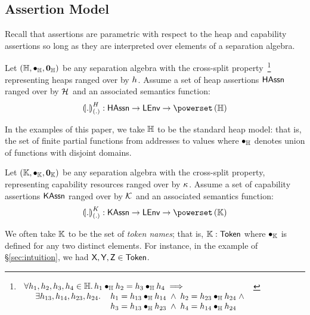 \subsection{Assertion Model}
Recall that \colosl assertions are parametric with respect to the heap and capability assertions so long as they are interpreted over elements of a separation algebra. 
%
\begin{parameter}\label{par:heapSA}
Let $(\mathbb{H}, \bullet_{\mathbb{H}}, \mathbf{0}_{\mathbb{H}})$ be any separation algebra with the cross-split property~\cite{dockins2009fresh}\footnote{%
$	
\begin{array}[t]{l}
	\forall h_1, h_2, h_3, h_4 \in \mathbb{H}.\,
	h_1 \bullet_{\mathbb{H}} h_2 = h_3 \bullet_{\mathbb{H}} h_4 \implies \\
	\hspace*{0.3cm}	
	\begin{array}{l l}
		\exists h_{13}, h_{14}, h_{23}, h_{24}.\, &
		h_1 = h_{13} \bullet_{\mathbb{H}} h_{14} \;\land\; h_2 = h_{23} \bullet_{\mathbb{H}} h_{24} \;\land\\
		& h_3 = h_{13} \bullet_{\mathbb{H}} h_{23} \;\land\; h_4 = h_{14} \bullet_{\mathbb{H}} h_{24}
	\end{array}
\end{array}
$%
} representing heaps ranged over by $h_{}$. Assume a set of heap assertions $\textsf{HAssn}$ ranged over by $\mathcal{H}_{}$ and an associated semantics function:
%
\[
	\semH[\blankArg]{.} : \HAssertions \rightarrow \LEnv \rightarrow \pset{\Heaps}
\]
%
\end{parameter}
%
In the examples of this paper, we take $\mathbb{H}$ to be the standard heap model: that is, the set of finite partial functions from addresses to values where $\bullet_{\mathbb{H}}$ denotes union of functions with disjoint domains.
%
%
\begin{parameter}\label{par:capSA}
Let $\left(\mathbb{K}, \bullet_{\mathbb{K}}, \mathbf{0}_{\mathbb{K}}\right)$ be any separation algebra with the cross-split property, representing capability resources ranged over by $\kappa_{}$. Assume a set of capability assertions $\textsf{KAssn}$ ranged over by $\mathcal{K}_{}$ and an associated semantics function:
%
\[
	\semK[\blankArg]{.} : \KAssertions \rightarrow \LEnv \rightarrow \pset{\Caps}
\]
%
\end{parameter}
%
%
We often take $\mathbb{K}$ to be the set of \emph{token names}; that is, $\mathbb{K}: \textsf{Token}$ where $\bullet_{\mathbb{K}}$ is defined for any two distinct elements. For instance, in the example of \S\ref{sec:intuition}, we had $\textsf{X}, \textsf{Y}, \textsf{Z} \in \textsf{Token}$.

